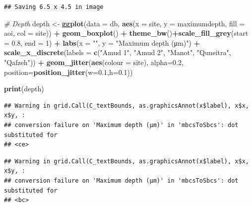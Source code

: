 \documentclass[
]{article}
\newenvironment{Shaded}{\begin{snugshade}}{\end{snugshade}}
\newcommand{\AttributeTok}[1]{\textcolor[rgb]{0.13,0.29,0.53}{#1}}
\newcommand{\CommentTok}[1]{\textcolor[rgb]{0.56,0.35,0.01}{\textit{#1}}}
\newcommand{\DecValTok}[1]{\textcolor[rgb]{0.00,0.00,0.81}{#1}}
\newcommand{\FloatTok}[1]{\textcolor[rgb]{0.00,0.00,0.81}{#1}}
\newcommand{\FunctionTok}[1]{\textcolor[rgb]{0.13,0.29,0.53}{\textbf{#1}}}
\newcommand{\NormalTok}[1]{#1}
\newcommand{\OtherTok}[1]{\textcolor[rgb]{0.56,0.35,0.01}{#1}}
\newcommand{\SpecialCharTok}[1]{\textcolor[rgb]{0.81,0.36,0.00}{\textbf{#1}}}
\newcommand{\StringTok}[1]{\textcolor[rgb]{0.31,0.60,0.02}{#1}}
\begin{document}
\begin{verbatim}
## Saving 6.5 x 4.5 in image
\end{verbatim}

\begin{Shaded}
\begin{Highlighting}[]
\CommentTok{\# Depth}
\NormalTok{depth }\OtherTok{\textless{}{-}} \FunctionTok{ggplot}\NormalTok{(}\AttributeTok{data =}\NormalTok{ db, }\FunctionTok{aes}\NormalTok{(}\AttributeTok{x =}\NormalTok{ site, }\AttributeTok{y =}\NormalTok{ maximumdepth, }\AttributeTok{fill =}\NormalTok{ aoi, }\AttributeTok{col =}\NormalTok{ site)) }\SpecialCharTok{+}  
           \FunctionTok{geom\_boxplot}\NormalTok{() }\SpecialCharTok{+}
           \FunctionTok{theme\_bw}\NormalTok{()}\SpecialCharTok{+}\FunctionTok{scale\_fill\_grey}\NormalTok{(}\AttributeTok{start =} \FloatTok{0.8}\NormalTok{, }\AttributeTok{end =} \DecValTok{1}\NormalTok{) }\SpecialCharTok{+}
           \FunctionTok{labs}\NormalTok{(}\AttributeTok{x =} \StringTok{""}\NormalTok{, }\AttributeTok{y =} \StringTok{"Maximum depth (μm)"}\NormalTok{) }\SpecialCharTok{+}
           \FunctionTok{scale\_x\_discrete}\NormalTok{(}\AttributeTok{labels =} \FunctionTok{c}\NormalTok{(}\StringTok{"Amud 1"}\NormalTok{, }\StringTok{"Amud 2"}\NormalTok{, }\StringTok{"Manot"}\NormalTok{, }\StringTok{"Quneitra"}\NormalTok{, }\StringTok{"Qafzeh"}\NormalTok{)) }\SpecialCharTok{+}
           \FunctionTok{geom\_jitter}\NormalTok{(}\FunctionTok{aes}\NormalTok{(}\AttributeTok{colour =}\NormalTok{ site), }\AttributeTok{alpha=}\FloatTok{0.2}\NormalTok{, }\AttributeTok{position=}\FunctionTok{position\_jitter}\NormalTok{(}\AttributeTok{w=}\FloatTok{0.1}\NormalTok{,}\AttributeTok{h=}\FloatTok{0.1}\NormalTok{)) }

\FunctionTok{print}\NormalTok{(depth)}
\end{Highlighting}
\end{Shaded}

\begin{verbatim}
## Warning in grid.Call(C_textBounds, as.graphicsAnnot(x$label), x$x, x$y, :
## conversion failure on 'Maximum depth (μm)' in 'mbcsToSbcs': dot substituted for
## <ce>
\end{verbatim}

\begin{verbatim}
## Warning in grid.Call(C_textBounds, as.graphicsAnnot(x$label), x$x, x$y, :
## conversion failure on 'Maximum depth (μm)' in 'mbcsToSbcs': dot substituted for
## <bc>
\end{verbatim}
\end{document}
